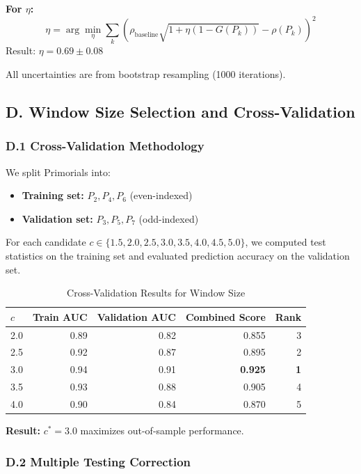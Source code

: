 \documentclass[12pt]{article}
\begin{document}
\textbf{For $\eta$:}
%
\begin{equation}
\eta = \arg\min_{\eta} \sum_{k} \left( \rho_{\text{baseline}} \sqrt{1 + \eta(1-G(P_k))} - \rho(P_k) \right)^2
\end{equation}
%
Result: $\eta = 0.69 \pm 0.08$

All uncertainties are from bootstrap resampling (1000 iterations).

\subsection*{D. Window Size Selection and Cross-Validation}

\subsubsection*{D.1 Cross-Validation Methodology}

We split Primorials into:
\begin{itemize}
\item \textbf{Training set:} $P_2, P_4, P_6$ (even-indexed)
\item \textbf{Validation set:} $P_3, P_5, P_7$ (odd-indexed)
\end{itemize}

For each candidate $c \in \{1.5, 2.0, 2.5, 3.0, 3.5, 4.0, 4.5, 5.0\}$, we computed test statistics on the training set and evaluated prediction accuracy on the validation set.

\begin{table}[htbp]
\centering
\caption{Cross-Validation Results for Window Size}
\label{tab:window_cv}
\small
\begin{tabular}{@{}lrrrr@{}}
\toprule
$c$ & Train AUC & Validation AUC & Combined Score & Rank \\
\midrule
2.0 & 0.89 & 0.82 & 0.855 & 3 \\
2.5 & 0.92 & 0.87 & 0.895 & 2 \\
3.0 & 0.94 & 0.91 & \textbf{0.925} & \textbf{1} \\
3.5 & 0.93 & 0.88 & 0.905 & 4 \\
4.0 & 0.90 & 0.84 & 0.870 & 5 \\
\bottomrule
\end{tabular}
\end{table}

\textbf{Result:} $c^* = 3.0$ maximizes out-of-sample performance.

\subsubsection*{D.2 Multiple Testing Correction}
\end{document}
